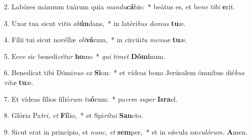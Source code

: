 \item 2. Labóres mánuum tuárum quia \textit{mandu}\textbf{cá}bis:~* beátus es, et be\textit{ne} \textit{tibi} \textbf{e}rit.
\item 3. Uxor tua sicut vi\textit{tis} \textit{ab}\textbf{ún}dans,~* in latéri\textit{bus} \textit{domus} \textbf{tu}æ.
\item 4. Fílii tui sicut novéllæ \textit{oli}\textbf{vá}rum,~* in circúi\textit{tu} \textit{mensæ} \textbf{tu}æ.
\item 5. Ecce sic benedi\textit{cétur} \textbf{ho}mo~* \textit{qui} \textit{timet} \textbf{Dómi}num.
\item 6. Benedícat tibi Dómi\textit{nus} \textit{ex} \textbf{Si}on:~* et vídeas bona Jerúsalem ómnibus dié\textit{bus} \textit{vitæ} \textbf{tu}æ.
\item 7. Et vídeas fílios filió\textit{rum} \textit{tu}\textbf{ó}rum:~* pa\hspace{0.03em}\textit{cem} \textit{super} \textbf{Isra}el.
\item 8. Glória Pa\textit{tri,} \textit{et} \textbf{Fí}lio,~* et Spi\textit{rítui} \textbf{San}cto.
\item 9. Sicut erat in princípio, et \textit{nunc,} \textit{et} \textbf{sem}per,~* et in sǽcula sæ\textit{culórum.} \textbf{A}men.
